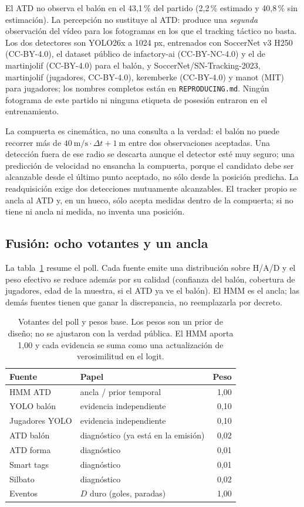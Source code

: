 \documentclass[10pt,a4paper]{article}
\begin{document}
El ATD no observa el balón en el 43,1\,\% del partido (2,2\,\% estimado y 40,8\,\% sin
estimación). La percepción no sustituye al ATD: produce
una \emph{segunda} observación del vídeo para los fotogramas en los que el tracking táctico no
basta. Los dos detectores son YOLO26x a 1024 px, entrenados con SoccerNet v3 H250 (CC-BY-4.0),
el dataset público de infactory-ai (CC-BY-NC-4.0) y el de martinjolif (CC-BY-4.0) para el balón, y
SoccerNet/SN-Tracking-2023, martinjolif (jugadores, CC-BY-4.0), keremberke (CC-BY-4.0) y manot
(MIT) para jugadores; los nombres completos están en \texttt{REPRODUCING.md}. Ningún fotograma de
este partido ni ninguna etiqueta de posesión entraron en el entrenamiento.

La compuerta es cinemática, no una consulta a la verdad: el balón no puede recorrer más de
$40\ \mathrm{m/s}\cdot\Delta t + 1\ \mathrm{m}$ entre dos observaciones aceptadas. Una detección
fuera de ese radio se descarta aunque el detector esté muy seguro; una predicción de velocidad no
ensancha la compuerta, porque el candidato debe ser alcanzable desde el último punto aceptado, no
sólo desde la posición predicha. La readquisición exige dos detecciones mutuamente alcanzables.
El tracker propio se ancla al ATD y, en un hueco, sólo acepta medidas dentro de la compuerta; si
no tiene ni ancla ni medida, no inventa una posición.

\subsection{Fusión: ocho votantes y un ancla}

La tabla~\ref{tab:weights} resume el poll. Cada fuente emite una distribución sobre H/A/D y el
peso efectivo se reduce además por su calidad (confianza del balón, cobertura de jugadores, edad
de la muestra, si el ATD ya ve el balón). El HMM es el ancla; las demás fuentes tienen que ganar
la discrepancia, no reemplazarla por decreto.

\begin{table}[t]
\centering
\small
\caption{Votantes del poll y pesos base. Los pesos son un prior de diseño; no se ajustaron con la
verdad pública. El HMM aporta 1,00 y cada evidencia se suma como una actualización de
verosimilitud en el logit.}
\label{tab:weights}
\begin{tabular}{llr}
\toprule
Fuente & Papel & Peso \\
\midrule
HMM ATD & ancla / prior temporal & 1,00 \\
YOLO balón & evidencia independiente & 0,10 \\
Jugadores YOLO & evidencia independiente & 0,10 \\
ATD balón & diagnóstico (ya está en la emisión) & 0,02 \\
ATD forma & diagnóstico & 0,01 \\
Smart tags & diagnóstico & 0,01 \\
Silbato & diagnóstico & 0,02 \\
Eventos & $D$ duro (goles, paradas) & 1,00 \\
\bottomrule
\end{tabular}
\end{table}
\end{document}
